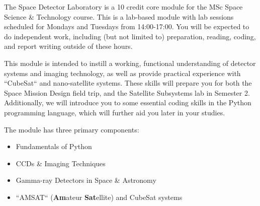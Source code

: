 \documentclass{tufte-book}
\begin{document}
{The Space Detector Laboratory} is a 10 credit core module for the MSc Space Science \& Technology course. This is a lab-based module with lab sessions scheduled for Mondays and Tuesdays from 14:00-17:00. You will be expected to do independent work, including (but not limited to) preparation, reading, coding, and report writing outside of these hours. 

This module is intended to instill a working, functional understanding of detector systems and imaging technology, as well as provide practical experience with ``CubeSat`` and nano-satellite systems. These skills will prepare you for both the Space Mission Design field trip, and the Satellite Subsystems lab in Semester 2. Additionally, we will introduce you to some essential coding skills in the Python programming language, which will further aid you later in your studies.


The module has three primary components:

\begin{itemize}
    \item Fundamentals of Python
    \item CCDs \& Imaging Techniques
    \item Gamma-ray Detectors in Space \& Astronomy
    \item ``AMSAT`` (\textbf{Am}ateur \textbf{Sat}ellite) and CubeSat systems
\end{itemize}

\newpage
\end{document}
